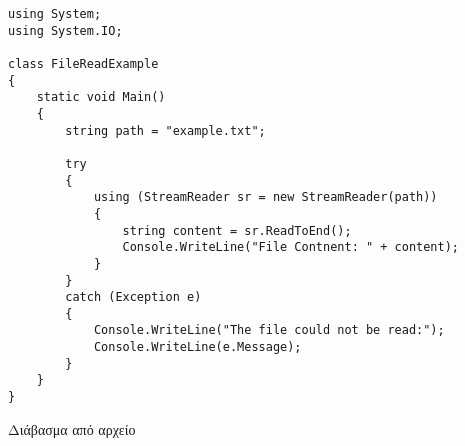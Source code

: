 \begin{listing}[htbp]
\begin{verbatim}
using System;
using System.IO;

class FileReadExample
{
    static void Main()
    {
        string path = "example.txt";

        try
        {
            using (StreamReader sr = new StreamReader(path))
            {
                string content = sr.ReadToEnd();
                Console.WriteLine("File Contnent: " + content);
            }
        } 
        catch (Exception e)
        {
            Console.WriteLine("The file could not be read:");
            Console.WriteLine(e.Message);
        }
    }
}
\end{verbatim}
\caption{Διάβασμα από αρχείο}
\label{ReadFile}
\end{listing}